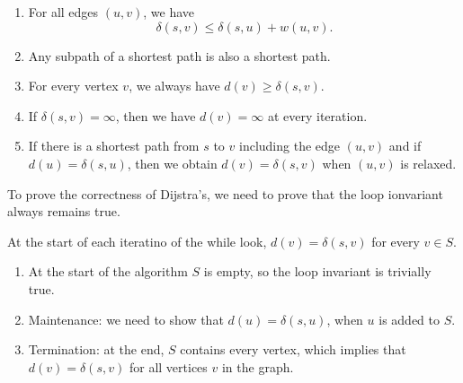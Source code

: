 \begin{proposition}
    \hfill
    \begin{enumerate}
        \item For all edges $(u, v)$, we have
            \[ \delta(s, v) \leq \delta(s, u) + w(u, v). \]

        \item Any subpath of a shortest path is also a shortest path.

        \item For every vertex $v$, we always have $d(v) \geq \delta(s, v)$.

        \item If $\delta(s, v) = \infty$, then we have $d(v) = \infty$ 
            at every iteration.

        \item If there is a shortest path from $s$ to $v$ including the
            edge $(u,v)$ and if $d(u) = \delta(s, u)$,
            then we obtain $d(v) = \delta(s, v)$ when $(u, v)$ is relaxed.
    \end{enumerate}
\end{proposition}

To prove the correctness of Dijstra's, we need to prove that the loop ionvariant always remains true.

At the start of each iteratino of the while look, $d(v) = \delta(s, v)$ for every $v \in S$.
\begin{enumerate}
    \item At the start of the algorithm $S$ is empty, so the loop invariant is trivially true.
    \item Maintenance: we need to show that $d(u) = \delta(s, u)$, when $u$ is added to $S$.
    \item Termination: at the end, $S$ contains every vertex, which implies that 
        $d(v) = \delta(s, v)$ for all vertices $v$ in the graph.
\end{enumerate}
